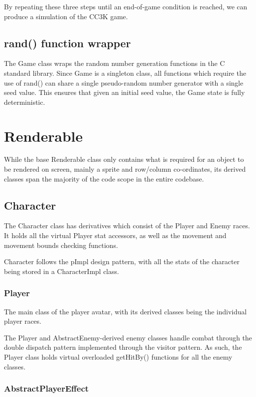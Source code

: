 \documentclass{article}
\begin{document}
By repeating these three steps until an end-of-game condition is reached, we can produce a simulation of the CC3K game.

\subsection{rand() function wrapper}

The Game class wraps the random number generation functions in the C standard library. Since Game is a singleton class, all functions which require the use of rand() can share a single pseudo-random number generator with a single seed value. This ensures that given an initial seed value, the Game state is fully deterministic.

\section{Renderable}

While the base Renderable class only contains what is required for an object to be rendered on screen, mainly a sprite and row/column co-ordinates, its derived classes span the majority of the code scope in the entire codebase.

\subsection{Character}

The Character class has derivatives which consist of the Player and Enemy races. It holds all the virtual Player stat accessors, as well as the movement and movement bounds checking functions.

Character follows the pImpl design pattern, with all the stats of the character being stored in a CharacterImpl class.

\subsubsection{Player}

The main class of the player avatar, with its derived classes being the individual player races.

The Player and AbstractEnemy-derived enemy classes handle combat through the double dispatch pattern implemented through the visitor pattern. As such, the Player class holds virtual overloaded getHitBy() functions for all the enemy classes.

\subsubsection{AbstractPlayerEffect}
\end{document}
